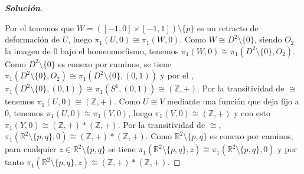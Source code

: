 \begin{proof}[\textbf{Solución}]
\begin{center}
\end{center}
Por el  tenemos que $W=([-1,0]\times[-1,1])\setminus\{p\}$ es un retracto de deformación de $U$, luego $\pi_1(U,0)\cong\pi_1(W,0)$. Como $W\cong D^2\setminus\{0\}$, siendo $O_2$ la imagen de $0$ bajo el homeomorfismo, tenemos $\pi_1(W,0)\cong\pi_1(D^2\setminus\{0\},O_2)$. Como $D^2\setminus\{0\}$ es conexo por caminos, se tiene $\pi_1(D^2\setminus\{0\},O_2)\cong\pi_1(D^2\setminus\{0\},(0,1))$ y por el , $\pi_1(D^2\setminus\{0\},(0,1))\cong\pi_1(S^1,(0,1))\cong(\mathbb{Z},+)$. Por la transitividad de $\cong$ tenemos $\pi_1(U,0)\cong(\mathbb{Z},+)$. Como $U\cong V$ mediante una función que deja fijo a $0$, tenemos $\pi_1(U,0)\cong\pi_1(V,0)$, luego $\pi_1(V,0)\cong(\mathbb{Z},+)$ y con esto $\pi_1(Y,0)\cong(\mathbb{Z},+)*(\mathbb{Z},+)$. Por la transitividad de $\cong$, $\pi_1(\mathbb{R}^2\setminus\{p,q\},0)\cong(\mathbb{Z},+)*(\mathbb{Z},+)$. Como $\mathbb{R}^2\setminus\{p,q\}$ es conexo por caminos, para cualquier $z\in\mathbb{R}^2\setminus\{p,q\}$ se tiene $\pi_1(\mathbb{R}^2\setminus\{p,q\},z)\cong\pi_1(\mathbb{R}^2\setminus\{p,q\},0)$ y por tanto $\pi_1(\mathbb{R}^2\setminus\{p,q\},z)\cong(\mathbb{Z},+)*(\mathbb{Z},+)$.
\end{proof}
